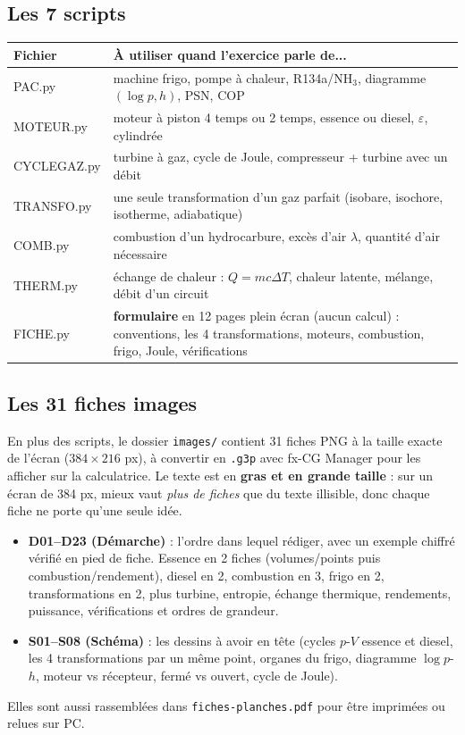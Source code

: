 \documentclass[10.5pt,a4paper]{article}
\begin{document}
\subsection*{Les 7 scripts}
\begin{center}
\renewcommand{\arraystretch}{1.35}
\begin{tabularx}{\linewidth}{@{}>{\ttfamily}l X@{}}
\toprule
\textrm{\textbf{Fichier}} & \textbf{À utiliser quand l'exercice parle de...} \\
\midrule
PAC.py & machine frigo, pompe à chaleur, R134a/NH$_3$, diagramme $(\log p,h)$, PSN, COP \\
MOTEUR.py & moteur à piston 4 temps ou 2 temps, essence ou diesel, $\varepsilon$, cylindrée \\
CYCLEGAZ.py & turbine à gaz, cycle de Joule, compresseur + turbine avec un débit \\
TRANSFO.py & une seule transformation d'un gaz parfait (isobare, isochore, isotherme, adiabatique) \\
COMB.py & combustion d'un hydrocarbure, excès d'air $\lambda$, quantité d'air nécessaire \\
THERM.py & échange de chaleur : $Q=mc\Delta T$, chaleur latente, mélange, débit d'un circuit \\
FICHE.py & \textbf{formulaire} en 12 pages plein écran (aucun calcul) : conventions, les 4
transformations, moteurs, combustion, frigo, Joule, vérifications \\
\bottomrule
\end{tabularx}
\end{center}

\subsection*{Les 31 fiches images}
En plus des scripts, le dossier \texttt{images/} contient 31 fiches PNG à la taille exacte de l'écran
($384\times216$ px), à convertir en \texttt{.g3p} avec fx-CG Manager pour les afficher sur la
calculatrice. Le texte est en \textbf{gras et en grande taille} : sur un écran de 384 px, mieux vaut
\emph{plus de fiches} que du texte illisible, donc chaque fiche ne porte qu'une seule idée.
\begin{itemize}[leftmargin=1.4em,nosep]
\item \textbf{D01--D23 (Démarche)} : l'ordre dans lequel rédiger, avec un exemple chiffré vérifié en pied
de fiche. Essence en 2 fiches (volumes/points puis combustion/rendement), diesel en 2, combustion en 3,
frigo en 2, transformations en 2, plus turbine, entropie, échange thermique, rendements, puissance,
vérifications et ordres de grandeur.
\item \textbf{S01--S08 (Schéma)} : les dessins à avoir en tête (cycles $p$-$V$ essence et diesel, les 4
transformations par un même point, organes du frigo, diagramme $\log p$-$h$, moteur vs récepteur,
fermé vs ouvert, cycle de Joule).
\end{itemize}
Elles sont aussi rassemblées dans \texttt{fiches-planches.pdf} pour être imprimées ou relues sur PC.
\end{document}
